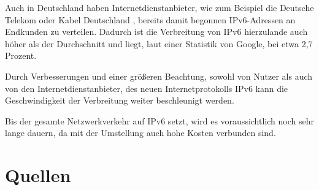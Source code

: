 \documentclass[a4paper, 12pt]{scrartcl}
\begin{document}
Auch in Deutschland haben Internetdienstanbieter, wie zum Beispiel die Deutsche Telekom \cite{IPv6Tel} oder Kabel Deutschland \cite{IPv6KD}, bereits damit begonnen IPv6-Adressen an Endkunden zu verteilen. 
Dadurch ist die Verbreitung von IPv6 hierzulande auch höher als der Durchschnitt und liegt, laut einer Statistik von Google, bei etwa 2,7 Prozent.

Durch Verbesserungen und einer größeren Beachtung, sowohl von Nutzer als auch von den Internetdienstanbieter, des neuen Internetprotokolls IPv6 kann die Geschwindigkeit der Verbreitung weiter beschleunigt werden.

Bis der gesamte Netzwerkverkehr auf IPv6 setzt, wird es voraussichtlich noch sehr lange dauern, da mit der Umstellung auch hohe Kosten verbunden sind. 


\newpage

\section{Quellen}
\renewcommand\refname{ }
{}



\end{document}
